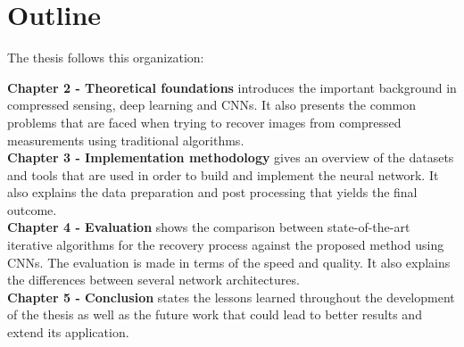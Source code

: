 \section{Outline}
The thesis follows this organization: \

{\bfseries Chapter 2 - Theoretical foundations}  introduces the important background in compressed sensing, deep learning and CNNs. It also presents the common problems that are faced when trying to recover images from compressed measurements using traditional algorithms. \\
{\bfseries Chapter 3 - Implementation methodology} gives an overview of the datasets and tools that are used in order to build and implement the neural network. It also explains the data preparation and post processing that yields the final outcome. \\
{\bfseries Chapter 4 - Evaluation} shows the comparison between state-of-the-art iterative algorithms for the recovery process against the proposed method using CNNs. The evaluation is made in terms of the speed and quality. It also explains the differences between several network architectures.  \\
{\bfseries Chapter 5 - Conclusion} states the lessons learned throughout the development of the thesis as well as the future work that could lead to better results and extend its application. \\
